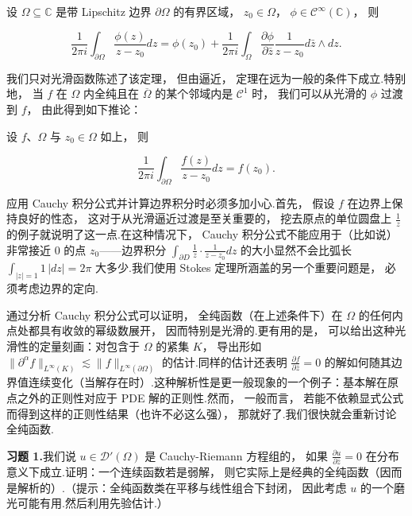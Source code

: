\begin{theorem}\label{thm:c4-1.2}
设 $\Omega \subseteq \mathbb{C}$ 是带 Lipschitz 边界 $\partial\Omega$ 的有界区域， $z_{0} \in \Omega$， $\phi \in \mathcal{C}^{\infty}(\mathbb{C})$， 则

\[
\frac{1}{2\pi i}\int_{\partial\Omega}\frac{\phi(z)}{z-z_{0}}dz = \phi(z_{0}) + \frac{1}{2\pi i}\int_{\Omega}\frac{\partial \phi}{\partial \bar{z}}\frac{1}{z-z_{0}}d\bar{z} \wedge dz.
\]
\end{theorem}

我们只对光滑函数陈述了该定理， 但由逼近， 定理在远为一般的条件下成立.特别地， 当 $f$ 在 $\Omega$ 内全纯且在 $\overline{\Omega}$ 的某个邻域内是 $\mathcal{C}^{1}$ 时， 我们可以从光滑的 $\phi$ 过渡到 $f$， 由此得到如下推论：

\begin{corollary}\label{cor:c4-1.3}
设 $f$、$\Omega$ 与 $z_{0} \in \Omega$ 如上， 则

\[
\frac{1}{2\pi i}\int_{\partial\Omega}\frac{f(z)}{z-z_{0}}dz = f(z_{0}).
\]
\end{corollary}

\begin{remark*}
应用 Cauchy 积分公式并计算边界积分时必须多加小心.首先， 假设 $f$ 在边界上保持良好的性态， 这对于从光滑逼近过渡是至关重要的， 挖去原点的单位圆盘上 $\frac{1}{z}$ 的例子就说明了这一点.在这种情况下， Cauchy 积分公式不能应用于（比如说）非常接近 0 的点 $z_{0}$——边界积分 $\int_{\partial D}\frac{1}{z} \cdot \frac{1}{z-z_{0}}dz$ 的大小显然不会比弧长 $\int_{|z|=1}1\, |dz| = 2\pi$ 大多少.我们使用 Stokes 定理所涵盖的另一个重要问题是， 必须考虑边界的定向.
\end{remark*}

通过分析 Cauchy 积分公式可以证明， 全纯函数（在上述条件下）在 $\Omega$ 的任何内点处都具有收敛的幂级数展开， 因而特别是光滑的.更有用的是， 可以给出这种光滑性的定量刻画：对包含于 $\Omega$ 的紧集 $K$， 导出形如 $\|\partial^{\alpha}f\|_{L^{\infty}(K)} \lesssim \|f\|_{L^{\infty}(\partial\Omega)}$ 的估计.同样的估计还表明 $\frac{\partial f}{\partial \bar{z}} = 0$ 的解如何随其边界值连续变化（当解存在时）.这种解析性是更一般现象的一个例子：基本解在原点之外的正则性对应于 PDE 解的正则性.然而， 一般而言， 若能不依赖显式公式而得到这样的正则性结果（也许不必这么强）， 那就好了.我们很快就会重新讨论全纯函数.

\noindent\textbf{习题 1.}\quad 我们说 $u \in \mathcal{D}'(\Omega)$ 是 Cauchy-Riemann 方程组的， 如果 $\frac{\partial u}{\partial \bar{z}} = 0$ 在分布意义下成立.证明：一个连续函数若是弱解， 则它实际上是经典的全纯函数（因而是解析的）.（提示：全纯函数类在平移与线性组合下封闭， 因此考虑 $u$ 的一个磨光可能有用.然后利用先验估计.）

